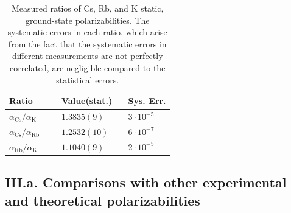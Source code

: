 \documentclass[twocolumn,pra,showpacs,superscriptaddress,longbibliography]{revtex4-1}   %
\newcommand{\sspace}{$\enspace$}
\newcommand{\ssspace}{$\quad$}
\newcommand{\ak}{\alpha_{\textrm{K}}}
\newcommand{\arb}{\alpha_{\textrm{Rb}}}
\newcommand{\acs}{\alpha_{\textrm{Cs}}}
\newcommand{\ratRbK}{1.1040(9)}
\newcommand{\ratCsK}{1.3835(9)}
\newcommand{\ratCsRb}{1.2532(10)}
\begin{document}
\begingroup
\begin{table}
\caption{\label{tableRatio}Measured ratios of Cs, Rb, and K static, ground-state polarizabilities. The systematic errors in each ratio, which arise from the fact that the systematic errors in different measurements are not perfectly correlated, are negligible compared to the statistical errors.}
\begin{center}
\begin{tabular}{lll}
\hline\hline
Ratio \ssspace \ssspace & Value(stat.) \sspace & Sys. Err. \\
\hline
$\acs/\ak$  & $\ratCsK$ & $3\cdot 10^{-5}$  \\
$\acs/\arb$ & $\ratCsRb$ & $6\cdot 10^{-7}$ \\
$\arb/\ak$  & $\ratRbK$ & $2\cdot 10^{-5}$ \\
\hline\hline
\end{tabular}
\end{center}
\end{table}
\endgroup

\subsection{III.a. Comparisons with other experimental and theoretical polarizabilities}
\end{document}
